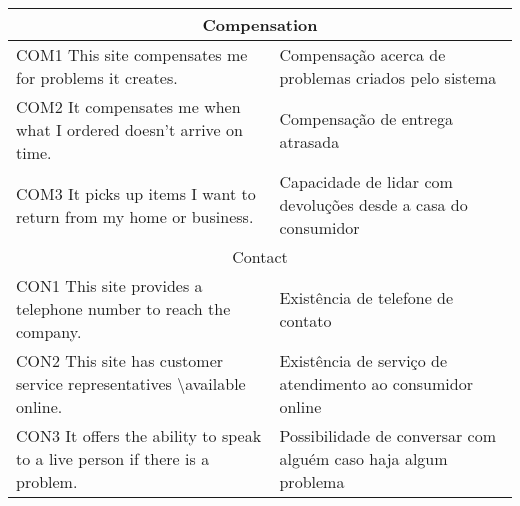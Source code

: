 \begin{apendicesenv}
\begin{table}[]
{\begin{tabular}{|l|l|}
\multicolumn{2}{|c|}{\cellcolor[HTML]{C0C0C0}Compensation} \\ \hline
COM1 This site compensates me for problems it creates. & Compensação acerca de problemas criados pelo sistema \\ \hline
COM2 It compensates me when what I ordered doesn’t arrive on time. & Compensação de entrega atrasada \\ \hline
COM3 It picks up items I want to return from my home or business. & Capacidade de lidar com devoluções desde a casa do consumidor \\ \hline
\multicolumn{2}{|c|}{\cellcolor[HTML]{C0C0C0}Contact} \\ \hline
CON1 This site provides a telephone number to reach the company. & Existência de telefone de contato \\ \hline
CON2 This site has customer service representatives \textbackslash{}available online. & Existência de serviço de atendimento ao consumidor online \\ \hline
CON3 It offers the ability to speak to a live person if there is a problem. & Possibilidade de conversar com alguém caso haja algum problema \\ \hline
\end{tabular}%
}
\end{table}


\end{apendicesenv}
